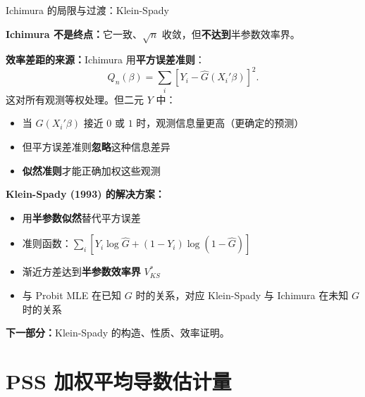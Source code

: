 \documentclass[aspectratio=169, 10pt]{beamer}
\begin{document}
\begin{frame}{Ichimura 的局限与过渡：Klein-Spady}

  \textbf{Ichimura 不是终点：}它一致、$\sqrt{n}$ 收敛，但\textbf{不达到}半参数效率界。

  \begin{highlightbox}
    \textbf{效率差距的来源：}Ichimura 用\textbf{平方误差准则}：
    $$Q_n(\beta) = \sum_i [Y_i - \hat G(X_i'\beta)]^2.$$
    这对所有观测等权处理。但二元 $Y$ 中：
    \begin{itemize}\setlength{\itemsep}{1pt}
      \item 当 $G(X_i'\beta)$ 接近 $0$ 或 $1$ 时，观测信息量更高（更确定的预测）
      \item 但平方误差准则\textbf{忽略}这种信息差异
      \item \textbf{似然准则}才能正确加权这些观测
    \end{itemize}
  \end{highlightbox}

  \begin{keybox}
    \textbf{Klein-Spady (1993) 的解决方案：}
    \begin{itemize}\setlength{\itemsep}{1pt}
      \item 用\textbf{半参数似然}替代平方误差
      \item 准则函数：$\sum_i [Y_i \log \hat G + (1-Y_i)\log(1 - \hat G)]$
      \item 渐近方差达到\textbf{半参数效率界} $V^{*}_{KS}$
      \item 与 Probit MLE 在已知 $G$ 时的关系，对应 Klein-Spady 与 Ichimura 在未知 $G$ 时的关系
    \end{itemize}
  \end{keybox}

  \textbf{下一部分：}Klein-Spady 的构造、性质、效率证明。

\end{frame}

\section{PSS 加权平均导数估计量}
\end{document}
